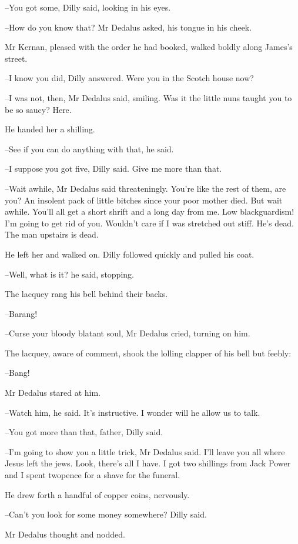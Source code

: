 --You got some,
Dilly said,
looking in his eyes.

--How do you know that?
Mr Dedalus asked,
his tongue in his cheek.

Mr Kernan,
pleased with the order he had booked,
walked boldly
along James's street.

--I know you did,
Dilly answered.
Were you in the Scotch house now?

--I was not, then,
Mr Dedalus said, smiling.
Was it the little nuns
taught you to be so saucy?
Here.

He handed her a shilling.

--See if you can do anything with that,
he said.

--I suppose you got five,
Dilly said.
Give me more than that.

--Wait awhile,
Mr Dedalus said threateningly.
You're like the rest of
them, are you?
An insolent pack of little bitches since your poor mother
died.
But wait awhile.
You'll all get a short shrift and a long day from
me.
Low blackguardism!
I'm going to get rid of you.
Wouldn't care if I
was stretched out stiff.
He's dead.
The man upstairs is dead.

He left her and walked on.
Dilly followed quickly and pulled his coat.

--Well, what is it?
he said, stopping.

The lacquey rang his bell behind their backs.

--Barang!

--Curse your bloody blatant soul,
Mr Dedalus cried,
turning on him.

The lacquey,
aware of comment,
shook the lolling clapper of his bell
but feebly:

--Bang!

Mr Dedalus stared at him.

--Watch him,
he said.
It's instructive.
I wonder will he allow us to talk.

--You got more than that, father,
Dilly said.

--I'm going to show you a little trick,
Mr Dedalus said.
I'll leave you
all where Jesus left the jews.
Look, there's all I have.
I got two
shillings from Jack Power
and I spent twopence for a shave for the
funeral.

He drew forth a handful of copper coins,
nervously.

--Can't you look for some money somewhere?
Dilly said.

Mr Dedalus thought and nodded.

